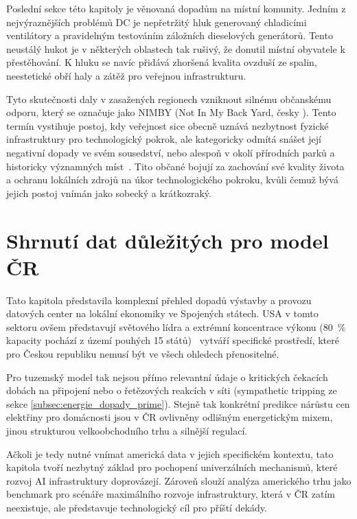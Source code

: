 Poslední sekce této kapitoly je věnovaná dopadům na místní komunity. Jedním z nejvýraznějších problémů DC je nepřetržitý hluk generovaný chladicími ventilátory a pravidelným testováním záložních dieselových generátorů. Tento neustálý hukot je v některých oblastech tak rušivý, že donutil místní obyvatele k přestěhování. K hluku se navíc přidává zhoršená kvalita ovzduší ze spalin, neestetické obří haly a zátěž pro veřejnou infrastrukturu.~\cite{kshetri_data_2024, ngata_cloud_2025}

Tyto skutečnosti daly v zasažených regionech vzniknout silnému občanskému odporu, který se označuje jako NIMBY (Not In My Back Yard, česky ). Tento termín vystihuje postoj, kdy veřejnost sice obecně uznává nezbytnost fyzické infrastruktury pro technologický pokrok, ale kategoricky odmítá snášet její negativní dopady ve svém sousedství, nebo alespoň v okolí přírodních parků a historicky významných míst~\cite{kshetri_data_2024}. Tito občané bojují za zachování své kvality života a ochranu lokálních zdrojů na úkor technologického pokroku, kvůli čemuž bývá jejich postoj vnímán jako sobecký a krátkozraký.

\section{Shrnutí dat důležitých pro model ČR}

Tato kapitola představila komplexní přehled dopadů výstavby a provozu datových center na lokální ekonomiky ve Spojených státech. USA v tomto sektoru ovšem představují světového lídra a extrémní koncentrace výkonu (80~\% kapacity pochází z území pouhých 15 států)~\cite{de_roucy-rochegonde_ai_2025} vytváří specifické prostředí, které pro Českou republiku nemusí být ve všech ohledech přenositelné.

Pro tuzemský model tak nejsou přímo relevantní údaje o kritických čekacích dobách na připojení nebo o řetězových reakcích v síti (sympathetic tripping ze sekce \ref{subsec:energie_dopady_prime}). Stejně tak konkrétní predikce nárůstu cen elektřiny pro domácnosti jsou v ČR ovlivněny odlišným energetickým mixem, jinou strukturou velkoobchodního trhu a silnější regulací.

Ačkoli je tedy nutné vnímat americká data v jejich specifickém kontextu, tato kapitola tvoří nezbytný základ pro pochopení univerzálních mechanismů, které rozvoj AI infrastruktury doprovázejí. Zároveň slouží analýza amerického trhu jako benchmark pro scénáře maximálního rozvoje infrastruktury, která v ČR zatím neexistuje, ale představuje technologický cíl pro příští dekády.

